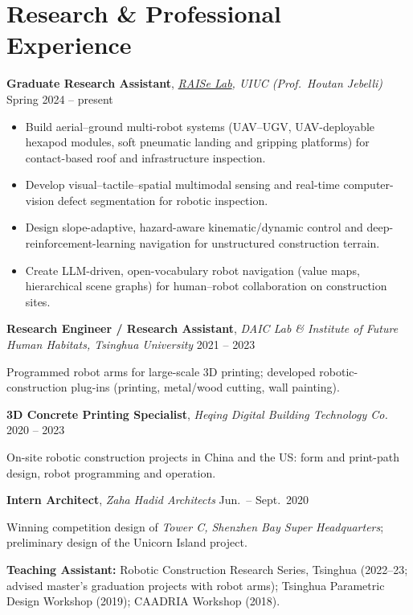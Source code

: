 \documentclass[10pt,a4paper]{article}
\newcommand{\entry}[3]{\textbf{#1}, \textit{#2} \hfill #3\par}
\begin{document}
\section{Research \& Professional Experience}
\entry{Graduate Research Assistant}{\href{https://raiselab.cee.illinois.edu/}{RAISe Lab}, UIUC (Prof.\ Houtan Jebelli)}{Spring 2024 -- present}
\begin{itemize}
\item Build aerial--ground multi-robot systems (UAV--UGV, UAV-deployable hexapod modules, soft pneumatic landing and gripping platforms) for contact-based roof and infrastructure inspection.
\item Develop visual--tactile--spatial multimodal sensing and real-time computer-vision defect segmentation for robotic inspection.
\item Design slope-adaptive, hazard-aware kinematic/dynamic control and deep-reinforcement-learning navigation for unstructured construction terrain.
\item Create LLM-driven, open-vocabulary robot navigation (value maps, hierarchical scene graphs) for human--robot collaboration on construction sites.
\end{itemize}
\entry{Research Engineer / Research Assistant}{DAIC Lab \& Institute of Future Human Habitats, Tsinghua University}{2021 -- 2023}
\quad Programmed robot arms for large-scale 3D printing; developed robotic-construction plug-ins (printing, metal/wood cutting, wall painting).\par
\entry{3D Concrete Printing Specialist}{Heqing Digital Building Technology Co.}{2020 -- 2023}
\quad On-site robotic construction projects in China and the US: form and print-path design, robot programming and operation.\par
\entry{Intern Architect}{Zaha Hadid Architects}{Jun.\ -- Sept.\ 2020}
\quad Winning competition design of \textit{Tower C, Shenzhen Bay Super Headquarters}; preliminary design of the Unicorn Island project.\par
\textbf{Teaching Assistant:} Robotic Construction Research Series, Tsinghua (2022--23; advised master's graduation projects with robot arms); Tsinghua Parametric Design Workshop (2019); CAADRIA Workshop (2018).\par

\end{document}

